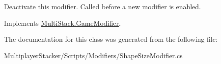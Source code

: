 Deactivate this modifier. Called before a new modifier is enabled. 



Implements \hyperlink{class_multi_stack_1_1_game_modifier_abe04db6ab31f5e5063739d8e5a3f7ad1}{Multi\+Stack.\+Game\+Modifier}.



The documentation for this class was generated from the following file\+:\begin{DoxyCompactItemize}
\item 
Multiplayer\+Stacker/\+Scripts/\+Modifiers/Shape\+Size\+Modifier.\+cs\end{DoxyCompactItemize}
